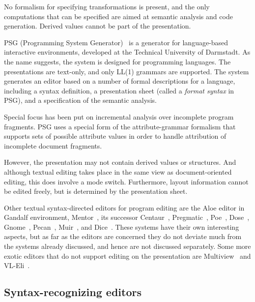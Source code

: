 \documentclass{speauth}
\begin{document}
No formalism for specifying transformations is present, and the only computations that can be specified are aimed at semantic analysis and code generation. Derived values cannot be part of the presentation.



PSG (Programming System Generator)~\cite{Bahlke86PSG} is a generator for language-based interactive environments, developed at the Technical University of Darmstadt. As the name suggests, the system is designed for programming languages. The presentations are text-only, and only LL(1) grammars are supported. The system generates an editor based on a number of formal descriptions for a language, including a syntax definition, a presentation sheet (called a {\em format syntax} in PSG), and a specification of the semantic analysis.

Special focus has been put on incremental analysis over incomplete program fragments. PSG uses a special form of the attribute-grammar formalism that supports sets of possible attribute values in order to handle attribution of incomplete document fragments.

However, the presentation may not contain derived values or structures. And although textual editing takes place in the same view as document-oriented editing, this does involve a mode switch. Furthermore, layout information cannot be edited freely, but is determined by the presentation sheet.


Other textual syntax-directed editors for program editing are the Aloe editor in Gandalf environment\cite{notkin85gandalf}, Mentor~\cite{donzeau84mentor}, its successor Centaur~\cite{borras88centaur}, Pregmatic~\cite{brand92pregmatic}, Poe~\cite{fischer84poe}, Dose~\cite{kaiser88dose}, Gnome~\cite{garlan84gnome}, Pecan~\cite{reiss84pecan}, Muir~\cite{normark88muir}, and Dice~\cite{fritzson84dice}. These systems have their own interesting aspects, but as far as the editors are concerned they do not deviate much from the systems already discussed, and hence are not discussed separately.
Some more exotic editors that do not support editing on the presentation are Multiview~\cite{read96multiview} and {VL-Eli}~\cite{kastens02vl-eli}.

\subsection{Syntax-recognizing editors}
\end{document}

